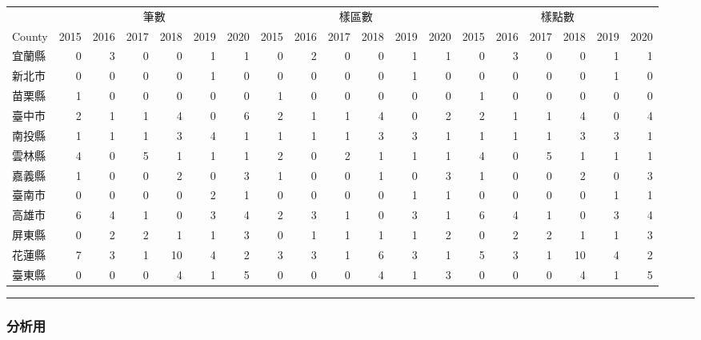 \documentclass[
]{article}
\begin{document}
\begin{table}[H]
\centering
\begin{tabular}{l|r|r|r|r|r|r|r|r|r|r|r|r|r|r|r|r|r|r}
\hline
\multicolumn{1}{c|}{ } & \multicolumn{6}{c|}{筆數} & \multicolumn{6}{c|}{樣區數} & \multicolumn{6}{c}{樣點數} \\
\cline{2-7} \cline{8-13} \cline{14-19}
County &  2015 &  2016 &  2017 &  2018 &  2019 &  2020 &  2015 &  2016 &  2017 &  2018 &  2019 &  2020 &  2015 &  2016 &  2017 &  2018 &  2019 &  2020\\
\hline
宜蘭縣 & 0 & 3 & 0 & 0 & 1 & 1 & 0 & 2 & 0 & 0 & 1 & 1 & 0 & 3 & 0 & 0 & 1 & 1\\
\hline
新北市 & 0 & 0 & 0 & 0 & 1 & 0 & 0 & 0 & 0 & 0 & 1 & 0 & 0 & 0 & 0 & 0 & 1 & 0\\
\hline
苗栗縣 & 1 & 0 & 0 & 0 & 0 & 0 & 1 & 0 & 0 & 0 & 0 & 0 & 1 & 0 & 0 & 0 & 0 & 0\\
\hline
臺中市 & 2 & 1 & 1 & 4 & 0 & 6 & 2 & 1 & 1 & 4 & 0 & 2 & 2 & 1 & 1 & 4 & 0 & 4\\
\hline
南投縣 & 1 & 1 & 1 & 3 & 4 & 1 & 1 & 1 & 1 & 3 & 3 & 1 & 1 & 1 & 1 & 3 & 3 & 1\\
\hline
雲林縣 & 4 & 0 & 5 & 1 & 1 & 1 & 2 & 0 & 2 & 1 & 1 & 1 & 4 & 0 & 5 & 1 & 1 & 1\\
\hline
嘉義縣 & 1 & 0 & 0 & 2 & 0 & 3 & 1 & 0 & 0 & 1 & 0 & 3 & 1 & 0 & 0 & 2 & 0 & 3\\
\hline
臺南市 & 0 & 0 & 0 & 0 & 2 & 1 & 0 & 0 & 0 & 0 & 1 & 1 & 0 & 0 & 0 & 0 & 1 & 1\\
\hline
高雄市 & 6 & 4 & 1 & 0 & 3 & 4 & 2 & 3 & 1 & 0 & 3 & 1 & 6 & 4 & 1 & 0 & 3 & 4\\
\hline
屏東縣 & 0 & 2 & 2 & 1 & 1 & 3 & 0 & 1 & 1 & 1 & 1 & 2 & 0 & 2 & 2 & 1 & 1 & 3\\
\hline
花蓮縣 & 7 & 3 & 1 & 10 & 4 & 2 & 3 & 3 & 1 & 6 & 3 & 1 & 5 & 3 & 1 & 10 & 4 & 2\\
\hline
臺東縣 & 0 & 0 & 0 & 4 & 1 & 5 & 0 & 0 & 0 & 4 & 1 & 3 & 0 & 0 & 0 & 4 & 1 & 5\\
\hline
\end{tabular}
\end{table}

\begin{center}\rule{0.5\linewidth}{0.5pt}\end{center}

\hypertarget{ux5206ux6790ux7528}{%
\subsubsection{\texorpdfstring{\textbf{分析用}}{分析用}}\label{ux5206ux6790ux7528}}
\end{document}
